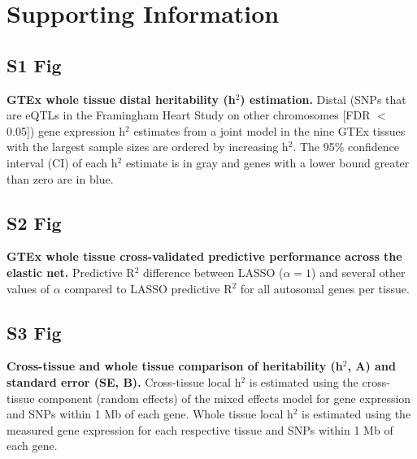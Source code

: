 \documentclass[10pt,letterpaper]{article}
\begin{document}
\nolinenumbers


%
%
% 



\section*{Supporting Information}


\subsection*{S1 Fig}
\label{S1_Fig}
{\bf GTEx whole tissue distal heritability (h$^2$) estimation.} Distal (SNPs that are eQTLs in the Framingham Heart Study on other chromosomes [FDR $<$ 0.05]) gene expression h$^2$ estimates from a joint model in the nine GTEx tissues with the largest sample sizes are ordered by increasing h$^2$. The 95\% confidence interval (CI) of each h$^2$ estimate is in gray and genes with a lower bound greater than zero are in blue.

\subsection*{S2 Fig}
\label{S2_Fig}
{\bf GTEx whole tissue cross-validated predictive performance across the elastic net.} Predictive R$^2$ difference between LASSO ($\alpha = 1$) and several other values of $\alpha$ compared to LASSO predictive R$^2$ for all autosomal genes per tissue.

\subsection*{S3 Fig}
\label{S3_Fig}
{\bf Cross-tissue and whole tissue comparison of heritability (h$^2$, A) and standard error (SE, B).} Cross-tissue local h$^2$ is estimated using the cross-tissue component (random effects) of the mixed effects model for gene expression and SNPs within 1 Mb of each gene. Whole tissue local h$^2$ is estimated using the measured gene expression for each respective tissue and SNPs within 1 Mb of each gene.
\end{document}
